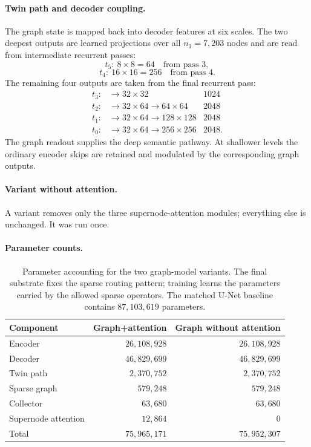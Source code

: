 \documentclass[12pt]{article}
\begin{document}
\paragraph{Twin path and decoder coupling.}
The graph state is mapped back into decoder features at six scales. The two
deepest outputs are learned projections over all \(n_3=7{,}203\) nodes and
are read from intermediate recurrent passes:
\[
t_5:\ 8\times8=64
\quad\text{from pass 3},
\]
\[
t_4:\ 16\times16=256
\quad\text{from pass 4}.
\]
The remaining four outputs are taken from the final recurrent pass:
\[
\begin{array}{llr}
t_3:&\to32\times32&1024\\
t_2:&\to32\times64\to64\times64&2048\\
t_1:&\to32\times64\to128\times128&2048\\
t_0:&\to32\times64\to256\times256&2048.
\end{array}
\]
The graph readout supplies the deep semantic pathway. At shallower levels the
ordinary encoder skips are retained and modulated by the corresponding graph
outputs.


\paragraph{Variant without attention.}
A variant removes only the three supernode-attention modules; everything
else is unchanged. It was run once.


\paragraph{Parameter counts.}
\begin{table}[H]
\centering
\small
\setlength{\tabcolsep}{5pt}
\renewcommand{\arraystretch}{1.08}
\begin{tabular}{@{}lrr@{}}
\toprule
Component
& Graph+attention
& Graph without attention\\
\midrule
Encoder
& \(26{,}108{,}928\)
& \(26{,}108{,}928\)\\
Decoder
& \(46{,}829{,}699\)
& \(46{,}829{,}699\)\\
Twin path
& \(2{,}370{,}752\)
& \(2{,}370{,}752\)\\
Sparse graph
& \(579{,}248\)
& \(579{,}248\)\\
Collector
& \(63{,}680\)
& \(63{,}680\)\\
Supernode attention
& \(12{,}864\)
& \(0\)\\
\midrule
Total
& \(75{,}965{,}171\)
& \(75{,}952{,}307\)\\
\bottomrule
\end{tabular}
\caption{Parameter accounting for the two graph-model variants. The final
substrate fixes the sparse routing pattern; training learns the parameters
carried by the allowed sparse operators. The matched U-Net baseline contains
\(87{,}103{,}619\) parameters.}
\label{tab:inpainting-parameters}
\end{table}
\end{document}
